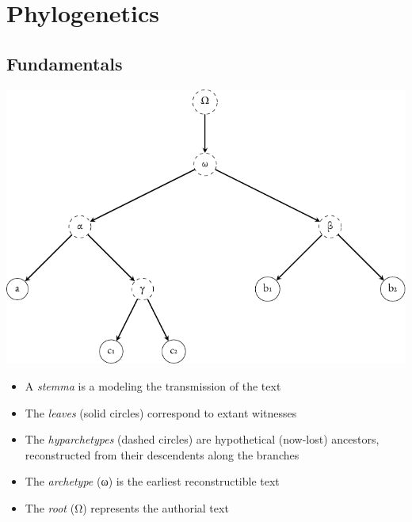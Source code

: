 \documentclass[10pt]{beamer}
\begin{document}
	\section{Phylogenetics}
	\sectionframe
	\subsection{Fundamentals}
	\begin{frame}
		\begin{center}
			\includegraphics[scale=0.5]{../img/gene-tree-rooted-site-1.pdf}
		\end{center}
		\begin{itemize}
			\item A \emph{stemma} is a  modeling the transmission of the text
			\item The \emph{leaves} (solid circles) correspond to extant witnesses
			\item The \emph{hyparchetypes} (dashed circles) are hypothetical (now-lost) ancestors, reconstructed from their descendents along the branches
			\item The \emph{archetype} ({\renewfontfamily{}\textgreek{ω}}) is the earliest reconstructible text
			\item The \emph{root} ({\renewfontfamily{}\textgreek{Ω}}) represents the authorial text
		\end{itemize}
	\end{frame}
\end{document}
